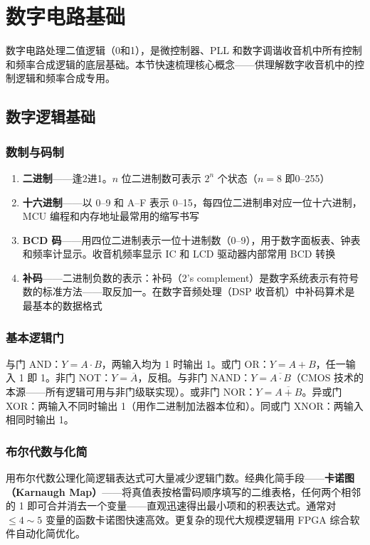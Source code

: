 \documentclass[12pt,UTF8]{ctexbook}
\begin{document}
\chapter{数字电路基础}
\label{chap:digital_circuit_basics}

数字电路处理二值逻辑（0和1），是微控制器、PLL 和数字调谐收音机中所有控制和频率合成逻辑的底层基础。本节快速梳理核心概念——供理解数字收音机中的控制逻辑和频率合成专用。

\section{数字逻辑基础}
\label{sec:digital_logic_basics}

\subsection{数制与码制}


\begin{enumerate}
\item \textbf{二进制}——逢2进1。$n$ 位二进制数可表示 $2^n$ 个状态（$n=8$ 即0–255）
\item \textbf{十六进制}——以 0–9 和 A–F 表示 0–15，每四位二进制串对应一位十六进制，MCU 编程和内存地址最常用的缩写书写
\item \textbf{BCD 码}——用四位二进制表示一位十进制数（0–9），用于数字面板表、钟表和频率计显示。收音机频率显示 IC 和 LCD 驱动器内部常用 BCD 转换
\item \textbf{补码}——二进制负数的表示：补码（2's complement）是数字系统表示有符号数的标准方法——取反加一。在数字音频处理（DSP 收音机）中补码算术是最基本的数据格式
\end{enumerate}

\subsection{基本逻辑门}

与门 AND：$Y=A\cdot B$，两输入均为 1 时输出 1。或门 OR：$Y=A+B$，任一输入 1 即 1。非门 NOT：$Y=\overline{A}$，反相。与非门 NAND：$Y=\overline{A\cdot B}$（CMOS 技术的本源——所有逻辑可用与非门级联实现）。或非门 NOR：$Y=\overline{A+B}$。异或门 XOR：两输入不同时输出 1（用作二进制加法器本位和）。同或门 XNOR：两输入相同时输出 1。

\subsection{布尔代数与化简}

用布尔代数公理化简逻辑表达式可大量减少逻辑门数。经典化简手段——\textbf{卡诺图（Karnaugh Map）}——将真值表按格雷码顺序填写的二维表格，任何两个相邻的 1 即可合并消去一个变量——直观迅速得出最小项和的积表达式。通常对 $\le4\sim5$ 变量的函数卡诺图快速高效。更复杂的现代大规模逻辑用 FPGA 综合软件自动化简优化。
\end{document}
